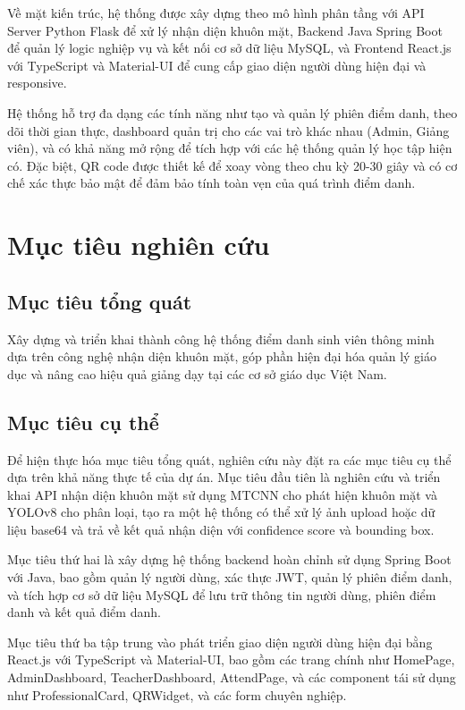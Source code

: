 \documentclass[12pt,a4paper]{report}
\begin{document}
Về mặt kiến trúc, hệ thống được xây dựng theo mô hình phân tầng với API Server Python Flask để xử lý nhận diện khuôn mặt, Backend Java Spring Boot để quản lý logic nghiệp vụ và kết nối cơ sở dữ liệu MySQL, và Frontend React.js với TypeScript và Material-UI để cung cấp giao diện người dùng hiện đại và responsive.

Hệ thống hỗ trợ đa dạng các tính năng như tạo và quản lý phiên điểm danh, theo dõi thời gian thực, dashboard quản trị cho các vai trò khác nhau (Admin, Giảng viên), và có khả năng mở rộng để tích hợp với các hệ thống quản lý học tập hiện có. Đặc biệt, QR code được thiết kế để xoay vòng theo chu kỳ 20-30 giây và có cơ chế xác thực bảo mật để đảm bảo tính toàn vẹn của quá trình điểm danh.

\section{Mục tiêu nghiên cứu}
\subsection{Mục tiêu tổng quát}
Xây dựng và triển khai thành công hệ thống điểm danh sinh viên thông minh dựa trên công nghệ nhận diện khuôn mặt, góp phần hiện đại hóa quản lý giáo dục và nâng cao hiệu quả giảng dạy tại các cơ sở giáo dục Việt Nam.

\subsection{Mục tiêu cụ thể}
Để hiện thực hóa mục tiêu tổng quát, nghiên cứu này đặt ra các mục tiêu cụ thể dựa trên khả năng thực tế của dự án. Mục tiêu đầu tiên là nghiên cứu và triển khai API nhận diện khuôn mặt sử dụng MTCNN cho phát hiện khuôn mặt và YOLOv8 cho phân loại, tạo ra một hệ thống có thể xử lý ảnh upload hoặc dữ liệu base64 và trả về kết quả nhận diện với confidence score và bounding box.

Mục tiêu thứ hai là xây dựng hệ thống backend hoàn chỉnh sử dụng Spring Boot với Java, bao gồm quản lý người dùng, xác thực JWT, quản lý phiên điểm danh, và tích hợp cơ sở dữ liệu MySQL để lưu trữ thông tin người dùng, phiên điểm danh và kết quả điểm danh.

Mục tiêu thứ ba tập trung vào phát triển giao diện người dùng hiện đại bằng React.js với TypeScript và Material-UI, bao gồm các trang chính như HomePage, AdminDashboard, TeacherDashboard, AttendPage, và các component tái sử dụng như ProfessionalCard, QRWidget, và các form chuyên nghiệp.
\end{document}
